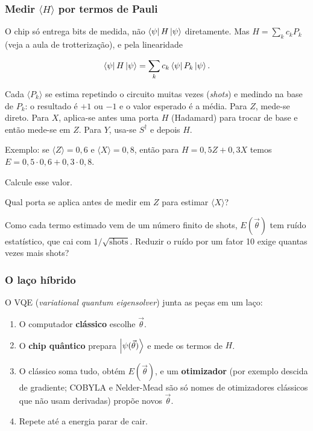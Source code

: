 \subsubsection{\texorpdfstring{Medir \(\langle H\rangle\) por termos de Pauli}{Medir \textbackslash langle H\textbackslash rangle por termos de Pauli}}\label{medir-langle-hrangle-por-termos-de-pauli}

O chip só entrega bits de medida, não \(\left<{\psi}\right| H\left|{\psi}\right>\) diretamente. Mas \(H = \sum_k c_k P_k\) (veja a aula de trotterização), e pela linearidade

\[
\left<{\psi}\right|H\left|{\psi}\right> = \sum_k c_k \left<{\psi}\right|P_k\left|{\psi}\right>.
\]

Cada \(\langle P_k\rangle\) se estima repetindo o circuito muitas vezes (\emph{shots}) e medindo na base de \(P_k\): o resultado é \(+1\) ou \(-1\) e o valor esperado é a média. Para \(Z\), mede-se direto. Para \(X\), aplica-se antes uma porta \(H\) (Hadamard) para trocar de base e então mede-se em \(Z\). Para \(Y\), usa-se \(S^\dagger\) e depois \(H\).

Exemplo: se \(\langle Z\rangle = 0{,}6\) e \(\langle X\rangle = 0{,}8\), então para \(H = 0{,}5Z + 0{,}3X\) temos \(E = 0{,}5\cdot0{,}6 + 0{,}3\cdot0{,}8\).

Calcule esse valor.

Qual porta se aplica antes de medir em \(Z\) para estimar \(\langle X\rangle\)?

Como cada termo estimado vem de um número finito de shots, \(E(\vec\theta)\) tem ruído estatístico, que cai com \(1/\sqrt{\text{shots}}\). Reduzir o ruído por um fator 10 exige quantas vezes mais shots?

\subsubsection{O laço híbrido}\label{o-lauxe7o-huxedbrido}

O VQE (\emph{variational quantum eigensolver}) junta as peças em um laço:

\begin{enumerate}
\def\labelenumi{\arabic{enumi}.}
\tightlist
\item
  O computador \textbf{clássico} escolhe \(\vec\theta\).
\item
  O \textbf{chip quântico} prepara \(\left|{\psi(\vec\theta)}\right>\) e mede os termos de \(H\).
\item
  O clássico soma tudo, obtém \(E(\vec\theta)\), e um \textbf{otimizador} (por exemplo descida de gradiente; COBYLA e Nelder-Mead são só nomes de otimizadores clássicos que não usam derivadas) propõe novos \(\vec\theta\).
\item
  Repete até a energia parar de cair.
\end{enumerate}

